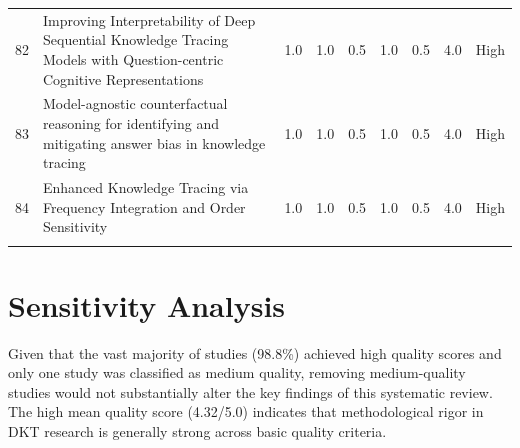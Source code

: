 \documentclass{article}
\begin{document}
\begin{longtable}{p{1cm}p{8cm}p{1cm}p{1cm}p{1cm}p{1cm}p{1cm}p{1.5cm}p{1.5cm}}
82 & Improving Interpretability of Deep Sequential Knowledge Tracing Models with Question-centric Cognitive Representations & 1.0 & 1.0 & 0.5 & 1.0 & 0.5 & 4.0 & High \\
83 & Model-agnostic counterfactual reasoning for identifying and mitigating answer bias in knowledge tracing & 1.0 & 1.0 & 0.5 & 1.0 & 0.5 & 4.0 & High \\
84 & Enhanced Knowledge Tracing via Frequency Integration and Order Sensitivity & 1.0 & 1.0 & 0.5 & 1.0 & 0.5 & 4.0 & High \\

\botrule
\end{longtable}

\section*{Sensitivity Analysis}

Given that the vast majority of studies (98.8\%) achieved high quality scores and only one study was classified as medium quality, removing medium-quality studies would not substantially alter the key findings of this systematic review. The high mean quality score (4.32/5.0) indicates that methodological rigor in DKT research is generally strong across basic quality criteria.
\end{document}

